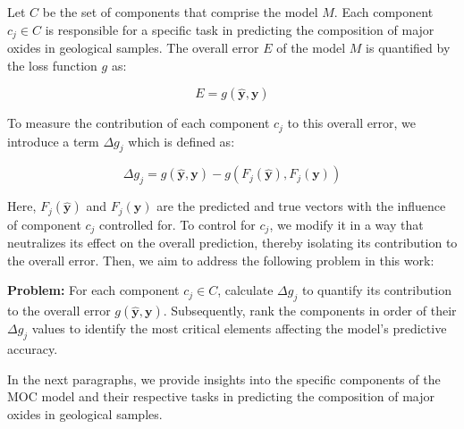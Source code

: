 Let $C$ be the set of components that comprise the model $M$.
Each component $c_j \in C$ is responsible for a specific task in predicting the composition of major oxides in geological samples.
The overall error $E$ of the model \( M \) is quantified by the loss function \( g \) as:

\[
E = g(\mathbf{\hat{y}}, \mathbf{y})
\]

To measure the contribution of each component \( c_j \) to this overall error, we introduce a term \( \Delta g_j \) which is defined as:

\[
\Delta g_j = g(\mathbf{\hat{y}}, \mathbf{y}) - g(F_j(\mathbf{\hat{y}}), F_j(\mathbf{y}))
\]

Here, \( F_j(\mathbf{\hat{y}}) \) and \( F_j(\mathbf{y}) \) are the predicted and true vectors with the influence of component \( c_j \) controlled for. To control for \( c_j \), we modify it in a way that neutralizes its effect on the overall prediction, thereby isolating its contribution to the overall error.
Then, we aim to address the following problem in this work:

\textbf{Problem:} For each component \( c_j \in C \), calculate \( \Delta g_j \) to quantify its contribution to the overall error \( g(\mathbf{\hat{y}}, \mathbf{y}) \). Subsequently, rank the components in order of their \( \Delta g_j \) values to identify the most critical elements affecting the model's predictive accuracy.

In the next paragraphs, we provide insights into the specific components of the MOC model and their respective tasks in predicting the composition of major oxides in geological samples.



